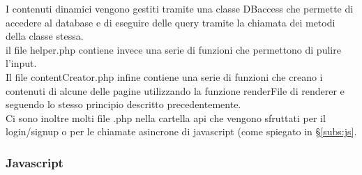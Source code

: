 I contenuti dinamici vengono gestiti tramite una classe DBaccess che permette di accedere al database e di eseguire delle query tramite la chiamata dei metodi della classe stessa.\\
il file helper.php contiene invece una serie di funzioni che permettono di pulire l'input.\\
Il file contentCreator.php infine contiene una serie di funzioni che creano i contenuti di alcune delle pagine utilizzando la funzione renderFile di renderer e seguendo lo stesso principio descritto precedentemente.\\

Ci sono inoltre molti file .php nella cartella api che vengono sfruttati per il login/signup o per le chiamate asincrone di javascript (come spiegato in \S\ref{subs:js}.








\subsubsection{Javascript}
